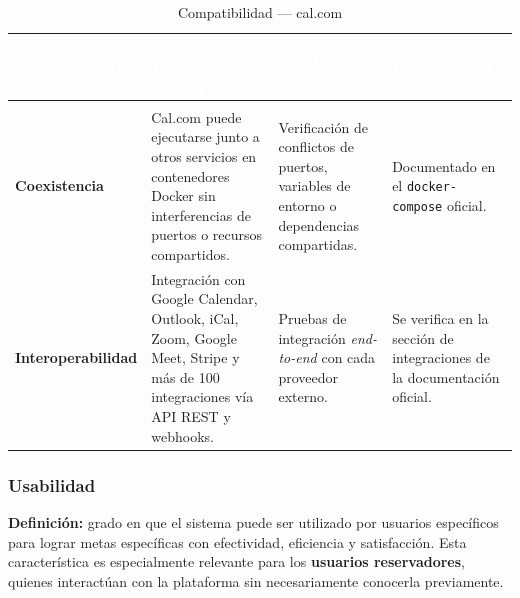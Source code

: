 \documentclass[12pt, a4paper]{article}
\newcommand{\rowpair}{\rowcolor{grisMedio}}
\newcommand{\rowimpar}{\rowcolor{grisClaro}}
\begin{document}
\begin{longtable}{>{\bfseries}p{3cm} p{4.5cm} p{4cm} p{3.5cm}}
\caption{Compatibilidad — cal.com} \label{tab:compat} \\
\rowcolor{azulClaro}
\textcolor{white}{\textbf{Subcaracterística}} &
\textcolor{white}{\textbf{Descripción aplicada a cal.com}} &
\textcolor{white}{\textbf{Criterio de evaluación}} &
\textcolor{white}{\textbf{Observaciones}} \\
\endfirsthead
\multicolumn{4}{c}{\tablename\ \thetable{} -- continuación} \\
\endhead
\rowpair
Coexistencia &
Cal.com puede ejecutarse junto a otros servicios en contenedores Docker sin
interferencias de puertos o recursos compartidos. &
Verificación de conflictos de puertos, variables de entorno o dependencias compartidas. &
Documentado en el \texttt{docker-compose} oficial. \\
\rowimpar
Interoperabilidad &
Integración con Google Calendar, Outlook, iCal, Zoom, Google Meet, Stripe y más de 100
integraciones vía API REST y webhooks. &
Pruebas de integración \textit{end-to-end} con cada proveedor externo. &
Se verifica en la sección de integraciones de la documentación oficial. \\
\end{longtable}

\subsubsection{Usabilidad}

\textbf{Definición:} grado en que el sistema puede ser utilizado por usuarios específicos
para lograr metas específicas con efectividad, eficiencia y satisfacción. Esta
característica es especialmente relevante para los \textbf{usuarios reservadores}, quienes
interactúan con la plataforma sin necesariamente conocerla previamente.
\end{document}
